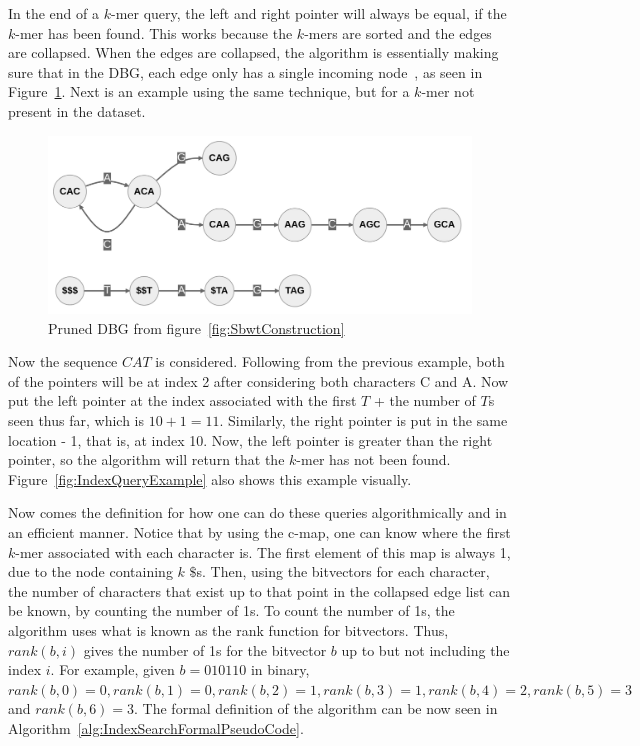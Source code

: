 In the end of a $k$-mer query, the left and right pointer will always be equal, if the $k$-mer has been found.
This works because the $k$-mers are sorted and the edges are collapsed.
When the edges are collapsed, the algorithm is essentially making sure that in the DBG, each edge only has a single incoming node~\cite{SBWT}, as seen in Figure~\ref{fig:PrunedDBG}.
Next is an example using the same technique, but for a $k$-mer not present in the dataset.

\begin{figure}[t]
  \centering
  \includegraphics[width=\textwidth]{images/PrunedDbg.png}
  \caption{Pruned DBG from figure~\ref{fig:SbwtConstruction}}\label{fig:PrunedDBG}
\end{figure}

Now the sequence $\mathit{CAT}$ is considered.
Following from the previous example, both of the pointers will be at index 2 after considering both characters C and A.
Now put the left pointer at the index associated with the first $T$ + the number of $T$s seen thus far, which is $10 + 1 = 11$.
Similarly, the right pointer is put in the same location \-- 1, that is, at index 10.
Now, the left pointer is greater than the right pointer, so the algorithm will return that the $k$-mer has not been found.
Figure~\ref{fig:IndexQueryExample} also shows this example visually.

Now comes the definition for how one can do these queries algorithmically and in an efficient manner.
Notice that by using the c-map, one can know where the first $k$-mer associated with each character is.
The first element of this map is always 1, due to the node containing $k$ $\$$s.
Then, using the bitvectors for each character, the number of characters that exist up to that point in the collapsed edge list can be known, by counting the number of 1s.
To count the number of 1s, the algorithm uses what is known as the rank function for bitvectors.
Thus, $rank(b, i)$ gives the number of 1s for the bitvector $b$  up to but not including the index $i$.
For example, given $b=010110$ in binary, $rank(b, 0) = 0, rank(b, 1) = 0, rank(b, 2) = 1, rank(b, 3) = 1, rank(b, 4) = 2, rank(b, 5) = 3$ and $rank(b, 6) = 3$.
The formal definition of the algorithm can be now seen in Algorithm~\ref{alg:IndexSearchFormalPseudoCode}.

